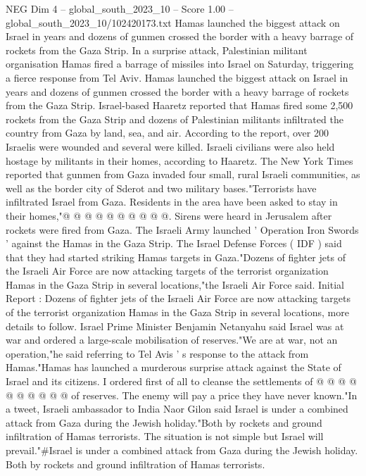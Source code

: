 \begin{textsample}{NEG Dim 4 – global\_south\_2023\_10 – Score 1.00 – global\_south\_2023\_10/102420173.txt}  \label{ex:f4_neg_036}
Hamas launched the biggest attack on Israel in years and dozens of gunmen crossed the border with a heavy barrage of rockets from the Gaza Strip.
In a surprise attack, Palestinian militant organisation Hamas fired a barrage of missiles into Israel on Saturday, triggering a fierce response from Tel Aviv.
Hamas launched the biggest attack on Israel in years and dozens of gunmen crossed the border with a heavy barrage of rockets from the Gaza Strip.
Israel-based Haaretz reported that Hamas fired some 2,500 rockets from the Gaza Strip and dozens of Palestinian militants infiltrated the country from Gaza by land, sea, and air.
According to the report, over 200 Israelis were wounded and several were killed.
Israeli civilians were also held hostage by militants in their homes, according to Haaretz.
The New York Times reported that gunmen from Gaza invaded four small, rural Israeli communities, as well as the border city of Sderot and two military bases."Terrorists have infiltrated Israel from Gaza.
Residents in the area have been asked to stay in their homes,"@ @ @ @ @ @ @ @ @ @.
Sirens were heard in Jerusalem after rockets were fired from Gaza.
The Israeli Army launched ' Operation Iron Swords ' against the Hamas in the Gaza Strip.
The Israel Defense Forces ( IDF ) said that they had started striking Hamas targets in Gaza."Dozens of fighter jets of the Israeli Air Force are now attacking targets of the terrorist organization Hamas in the Gaza Strip in several locations,"the Israeli Air Force said.
Initial Report : Dozens of fighter jets of the Israeli Air Force are now attacking targets of the terrorist organization Hamas in the Gaza Strip in several locations, more details to follow.
Israel Prime Minister Benjamin Netanyahu said Israel was at war and ordered a large-scale mobilisation of reserves."We are at war, not an operation,"he said referring to Tel Avis ' s response to the attack from Hamas."Hamas has launched a murderous surprise attack against the State of Israel and its citizens.
I ordered first of all to cleanse the settlements of @ @ @ @ @ @ @ @ @ @ of reserves.
The enemy will pay a price they have never known."In a tweet, Israeli ambassador to India Naor Gilon said Israel is under a combined attack from Gaza during the Jewish holiday."Both by rockets and ground infiltration of Hamas terrorists.
The situation is not simple but Israel will prevail."\#Israel is under a combined attack from Gaza during the Jewish holiday.
Both by rockets and ground infiltration of Hamas terrorists.

\end{textsample}
